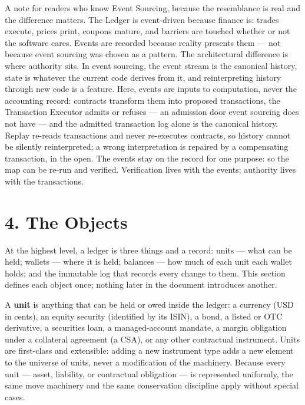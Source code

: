\documentclass[11pt,a4paper]{article}
\newcommand{\clabel}[1]{\leavevmode\hypertarget{clause-#1}{}%
  \marginpar{\raggedright\scriptsize\ttfamily\textcolor{gray}{#1}}}
\begin{document}
A note for readers who know Event Sourcing, because the resemblance is
real and the difference matters. The Ledger is event-driven because
finance is: trades execute, prices print, coupons mature, and barriers
are touched whether or not the software cares. Events are recorded
because reality presents them --- not because event sourcing was chosen
as a pattern. The architectural difference is where authority sits. In
event sourcing, the event stream is the canonical history, state is
whatever the current code derives from it, and reinterpreting history
through new code is a feature. Here, events are inputs to computation,
never the accounting record: contracts transform them into proposed
transactions, the Transaction Executor admits or refuses --- an
admission door event sourcing does not have --- and the admitted
transaction log alone is the canonical history. \clabel{C-3.11}Replay re-reads
transactions and never re-executes contracts, so history cannot be
silently reinterpreted; a wrong interpretation is repaired by a
compensating transaction, in the open. The events stay on the record for
one purpose: so the map can be re-run and verified. Verification lives
with the events; authority lives with the transactions.

\hypertarget{the-objects}{%
\section{4. The Objects}\label{the-objects}}

\clabel{C-4.1}At the highest level, a ledger is three things and a record: units ---
what can be held; wallets --- where it is held; balances --- how much of
each unit each wallet holds; and the immutable log that records every
change to them. This section defines each object once; nothing later in
the document introduces another.

\clabel{C-4.2}A \textbf{unit} is anything that can be held or owed inside the ledger:
a currency (USD in cents), an equity security (identified by its ISIN),
a bond, a listed or OTC derivative, a securities loan, a managed-account
mandate, a margin obligation under a collateral agreement (a CSA), or
any other contractual instrument. Units are first-class and extensible:
adding a new instrument type adds a new element to the universe of
units, never a modification of the machinery. Because every unit ---
asset, liability, or contractual obligation --- is represented
uniformly, the same move machinery and the same conservation discipline
apply without special cases.
\end{document}

